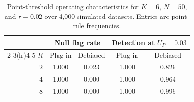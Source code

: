 \begin{table}[t]
\centering
\small
\begin{tabular}{rcccc}
\toprule
& \multicolumn{2}{c}{Null flag rate} &
\multicolumn{2}{c}{Detection at $U_P=0.03$} \\
\cmidrule(lr){2-3}\cmidrule(lr){4-5}
$R$ & Plug-in & Debiased & Plug-in & Debiased \\
\midrule
2 & 1.000 & 0.023 & 1.000 & 0.829 \\
4 & 1.000 & 0.000 & 1.000 & 0.964 \\
8 & 1.000 & 0.000 & 1.000 & 0.999 \\
\bottomrule
\end{tabular}
\caption{Point-threshold operating characteristics for $K=6$,
$N=50$, and $\tau=0.02$ over 4,000 simulated datasets. Entries are
point-rule frequencies.}
\label{tab:decision_simulation}
\end{table}
